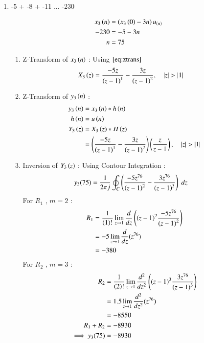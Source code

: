 \documentclass[journal,12pt,onecolumn]{IEEEtran}
\theoremstyle{remark}
\begin{document}
\begin{enumerate}
\vspace{0.5cm} 
\item
-5 + -8 + -11 ... -230
\vspace{0.5cm}

\begin{align}
x_3\left(n\right) &= \left(x_3\left(0\right) -3n\right)u_{\left(n\right)}\\
-230 &= -5 -3n \\
n &= 75
\end{align}
\begin{enumerate}
\item
Z-Transform of $x_3\left(n\right)$ :
Using $\eqref{eq:ztrans}$
\begin{align}
X_3\left(z\right) &=  \frac{-5z}{\left(z-1\right)^{1}} -
       \frac{3z}{\left(z-1\right)^{2}} \label{eq:ee25-8}
,\quad \left\vert z\right\vert>\left\vert1\right\vert 
\end{align}

    \vspace{0.5cm}
\item
Z-Transform of $y_3\left(n\right)$ :
\begin{align}
    y_3\left(n\right) &= x_3\left(n\right) * h\left(n\right) \\
         h\left(n\right) &= u\left(n\right) \\
    Y_3\left(z\right) &= X_3\left(z\right) * H\left(z\right)\\
             &= \left(\frac{-5z}{{\left(z-1\right)^1}}-
       \frac{3z}{\left(z-1\right)^2}\right)\left(\frac{z}{z-1}\right)
,\quad \left\vert z\right\vert>\left\vert1\right\vert 
    \end{align}

    \item
Inversion of $Y_3\left(z\right)$ :
Using Contour Integration :
\begin{align}
    y_3{(75)}&=\frac{1}{2\pi j}\oint_{C}\left(\frac{-5z^{76}}{\left(z-1\right)^2}-
       \frac{3z^{76}}{\left(z-1\right)^3}\right) \;dz 
\end{align}
For $R_1$ , $m=2$ :
\begin{align}
    R_1 &=\frac{1}{\left(1\right)!}\lim\limits_{z\to 1}\frac{d}{dz}\left({(z-1)}^{2}\frac{-5z^{76}}{{(z-1)}^2}\right)   \\
    &=-5\lim\limits_{z\to 1}\frac{d}{dz}(z^{76})   \\
    &= -380
        \end{align}
  For $R_2$ , $m=3$ :
    \begin{align}
    R_2 &=\frac{1}{\left(2\right)!}\lim\limits_{z\to 1}\frac{d^{2}}{dz^{2}}\left({(z-1)}^{3}\frac{3z^{76}}{{(z-1)}^3}\right)   \\
    &=1.5\lim\limits_{z\to 1}\frac{d^2}{dz^2}(z^{76})   \\
    &= -8550\\
    R_1 + R_2 &= -8930\\
    \implies  y_3{(75)} &= -8930
\end{align}
    \end{enumerate}




\end{enumerate}
\end{document}
